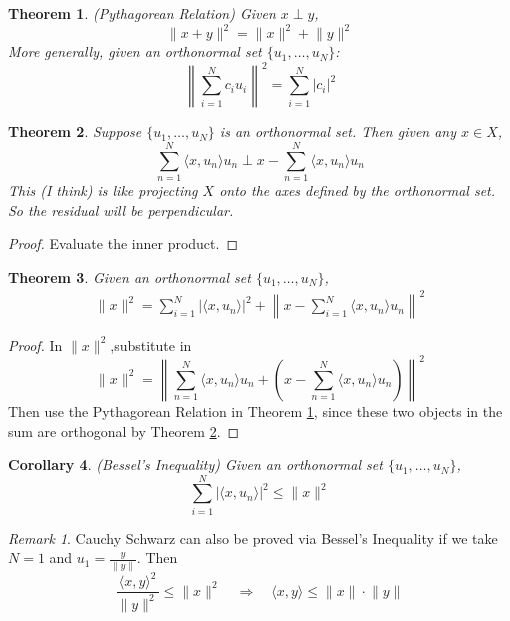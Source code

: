 \documentclass[12pt]{article}
\theoremstyle{plain}
\newtheorem{thm}{Theorem}[subsection]
\newtheorem{cor}[thm]{Corollary}
\theoremstyle{definition}
\theoremstyle{remark}
\newtheorem*{rmk}{Remark}
\begin{document}
\begin{thm}
\label{pythag}
\emph{(Pythagorean Relation)} Given $x\perp y$, 
\[
    \lVert x + y\rVert^2 = \lVert x\rVert^2 + \lVert y \rVert^2
\]
More generally, given an orthonormal set $\{u_1,\ldots,u_N\}$:
\[
    \left\lVert \sum_{i=1}^N c_i u_i \right\rVert^2 
    = \sum_{i=1}^N |c_i|^2
\]
\end{thm}

\begin{thm}
\label{projorth}
Suppose $\{u_1,\ldots,u_N\}$ is an orthonormal set. Then given any $x\in X$, 
\[
    \sum_{n=1}^N \langle x,u_n\rangle u_n
    \perp
    x -\sum_{n=1}^N \langle x,u_n\rangle u_n
\]
This (I think) is like projecting $X$ onto the axes defined by the orthonormal set. So the residual will be perpendicular.
\end{thm}
\begin{proof}
Evaluate the inner product.
\end{proof}

\begin{thm}
Given an orthonormal set $\{u_1,\ldots,u_N\}$, 
\begin{align*}
    \lVert x\rVert^2 = 
    \sum_{i=1}^N \bigl\lvert\langle x,u_n\rangle\bigr\rvert^2 
    + \left\lVert x -  \sum_{i=1}^N\langle x,u_n\rangle u_n \right\rVert^2
\end{align*}
\end{thm}
\begin{proof}
In $\lVert x\rVert^2$,substitute in 
\[
    \lVert x\rVert^2 = 
    \left\lVert
    \sum_{n=1}^N \langle x,u_n\rangle u_n
    + \left( x 
    -\sum_{n=1}^N \langle x,u_n\rangle u_n\right)
    \right\rVert^2 
\]
Then use the Pythagorean Relation in Theorem \ref{pythag}, since these two objects in the sum are orthogonal by Theorem \ref{projorth}.
\end{proof}

\begin{cor}
\emph{(Bessel's Inequality)} 
Given an orthonormal set $\{u_1,\ldots,u_N\}$, 
\[
    \sum_{i=1}^N 
    \bigl\lvert\langle x,u_n\rangle\bigr\rvert^2 
    \leq \lVert x\rVert^2
\]
\end{cor}

\begin{rmk}
Cauchy Schwarz can also be proved via Bessel's Inequality if we take $N=1$ and $u_1=\frac{y}{\lVert y\rVert}$. Then 
\[
    \frac{\langle x,y\rangle^2}{\lVert y\rVert^2} \leq \lVert x\rVert^2
    \quad\Rightarrow\quad
    \langle x,y\rangle \leq \lVert x\rVert\cdot \lVert y\rVert
\]
\end{rmk}
\end{document}
